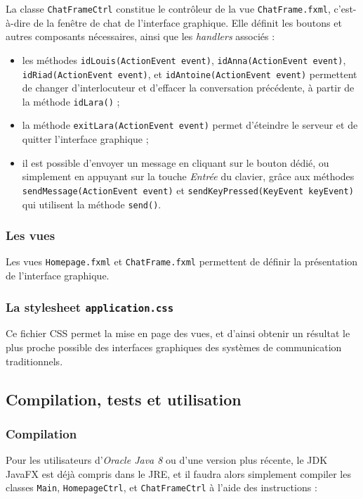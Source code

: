 \documentclass[10pt,a4paper]{article}
\begin{document}
La classe \texttt{ChatFrameCtrl} constitue le contrôleur de la vue \texttt{ChatFrame.fxml}, c'est-à-dire de la fenêtre de chat de l'interface graphique. Elle définit les boutons et autres composants nécessaires, ainsi que les \textit{handlers} associés :

\begin{itemize}
	\item les méthodes \texttt{idLouis(ActionEvent event)}, \texttt{idAnna(ActionEvent event)}, \texttt{idRiad(ActionEvent event)}, et \texttt{idAntoine(ActionEvent event)} permettent de changer d'interlocuteur et d'effacer la conversation précédente, à partir de la méthode \texttt{idLara()} ;
	\item la méthode \texttt{exitLara(ActionEvent event)} permet d'éteindre le serveur et de quitter l'interface graphique ;
	\item il est possible d'envoyer un message en cliquant sur le bouton dédié, ou simplement en appuyant sur la touche \textit{Entrée} du clavier, grâce aux méthodes \texttt{sendMessage(ActionEvent event)} et \texttt{sendKeyPressed(KeyEvent keyEvent)} qui utilisent la méthode \texttt{send()}.
\end{itemize}

\subsubsection{Les vues}

Les vues \texttt{Homepage.fxml} et \texttt{ChatFrame.fxml} permettent de définir la présentation de l'interface graphique.

\subsubsection{La stylesheet \texttt{application.css}}

Ce fichier CSS permet la mise en page des vues, et d'ainsi obtenir un résultat le plus proche possible des interfaces graphiques des systèmes de communication traditionnels.

\subsection{Compilation, tests et utilisation}

\subsubsection{Compilation}
Pour les utilisateurs d'\textit{Oracle Java 8} ou d'une version plus récente, le JDK JavaFX est déjà compris dans le JRE, et il faudra alors simplement compiler les classes \texttt{Main}, \texttt{HomepageCtrl}, et \texttt{ChatFrameCtrl} à l'aide des instructions :
\end{document}

